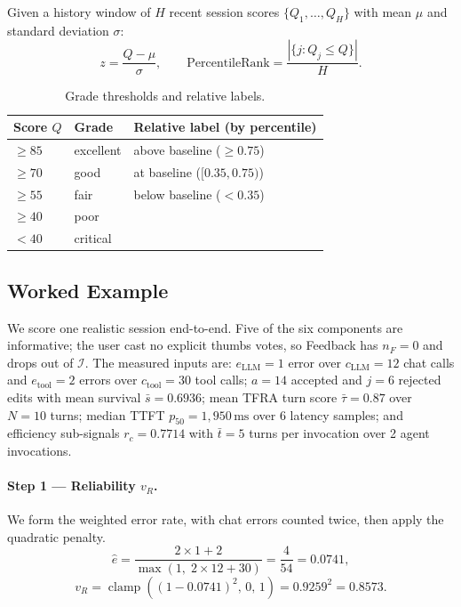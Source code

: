 \documentclass[11pt,a4paper]{article}
\newcommand{\calI}{\mathcal{I}}
\newcommand{\clamp}[3]{\operatorname{clamp}\!\left(#1,\,#2,\,#3\right)}
\begin{document}
Given a history window of $H$ recent session scores
$\{Q_1,\dots,Q_H\}$ with mean $\mu$ and standard deviation $\sigma$:
\[
  z = \frac{Q - \mu}{\sigma}, \qquad
  \text{PercentileRank} = \frac{|\{j : Q_j \leq Q\}|}{H}.
\]

\begin{table}[h!]
\centering
\caption{Grade thresholds and relative labels.}
\begin{tabular}{@{}lll@{}}
\toprule
Score $Q$ & Grade & Relative label (by percentile) \\
\midrule
$\geq 85$ & excellent & above baseline ($\geq 0.75$) \\
$\geq 70$ & good & at baseline ($[0.35, 0.75)$) \\
$\geq 55$ & fair & below baseline ($< 0.35$) \\
$\geq 40$ & poor & \\
$< 40$    & critical & \\
\bottomrule
\end{tabular}
\end{table}

\subsection{Worked Example}
\label{sec:quality-engine-example}

We score one realistic session end-to-end.  Five of the six components are
informative; the user cast no explicit thumbs votes, so Feedback has
$n_F = 0$ and drops out of $\calI$.  The measured inputs are:
$e_{\text{LLM}} = 1$ error over $c_{\text{LLM}} = 12$ chat calls and
$e_{\text{tool}} = 2$ errors over $c_{\text{tool}} = 30$ tool calls;
$a = 14$ accepted and $j = 6$ rejected edits with mean survival
$\bar{s} = 0.6936$; mean TFRA turn score $\bar{\tau} = 0.87$ over
$N = 10$ turns; median TTFT $p_{50} = 1{,}950\,\text{ms}$ over 6 latency
samples; and efficiency sub-signals $r_c = 0.7714$ with
$\bar{t} = 5$ turns per invocation over 2 agent invocations.

\paragraph{Step 1 --- Reliability $v_R$.}
We form the weighted error rate, with chat errors counted twice, then
apply the quadratic penalty.
\[
  \hat{e} = \frac{2 \times 1 + 2}{\max(1,\; 2 \times 12 + 30)}
          = \frac{4}{54}
          = 0.0741,
\]
\[
  v_R = \clamp{(1 - 0.0741)^2}{0}{1}
      = 0.9259^2
      = 0.8573.
\]
\end{document}
